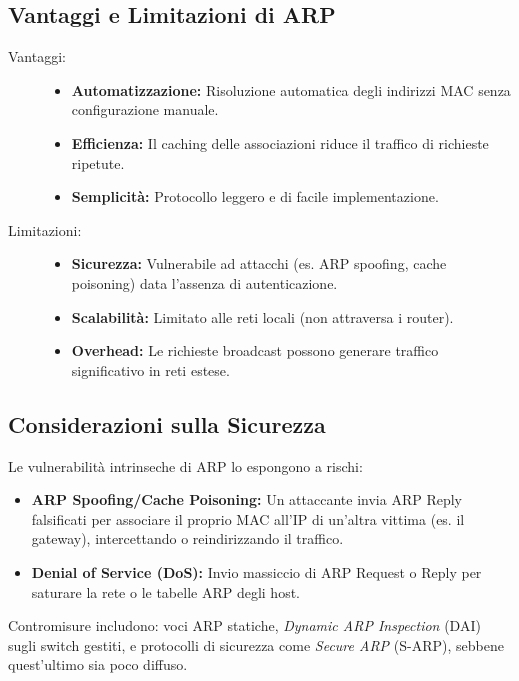 \subsection{Vantaggi e Limitazioni di ARP}
\begin{description}
    \item[Vantaggi:]
    \begin{itemize}[nosep]
        \item \textbf{Automatizzazione:} Risoluzione automatica degli indirizzi MAC senza configurazione manuale.
        \item \textbf{Efficienza:} Il caching delle associazioni riduce il traffico di richieste ripetute.
        \item \textbf{Semplicità:} Protocollo leggero e di facile implementazione.
    \end{itemize}
    \item[Limitazioni:]
    \begin{itemize}[nosep]
        \item \textbf{Sicurezza:} Vulnerabile ad attacchi (es. ARP spoofing, cache poisoning) data l'assenza di autenticazione.
        \item \textbf{Scalabilità:} Limitato alle reti locali (non attraversa i router).
        \item \textbf{Overhead:} Le richieste broadcast possono generare traffico significativo in reti estese.
    \end{itemize}
\end{description}

\subsection{Considerazioni sulla Sicurezza}
Le vulnerabilità intrinseche di ARP lo espongono a rischi:
\begin{itemize}[nosep]
    \item \textbf{ARP Spoofing/Cache Poisoning:} Un attaccante invia ARP Reply falsificati per associare il proprio MAC all'IP di un'altra vittima (es. il gateway), intercettando o reindirizzando il traffico.
    \item \textbf{Denial of Service (DoS):} Invio massiccio di ARP Request o Reply per saturare la rete o le tabelle ARP degli host.
\end{itemize}
Contromisure includono: voci ARP statiche, \textit{Dynamic ARP Inspection} (DAI) sugli switch gestiti, e protocolli di sicurezza come \textit{Secure ARP} (S-ARP), sebbene quest'ultimo sia poco diffuso.

